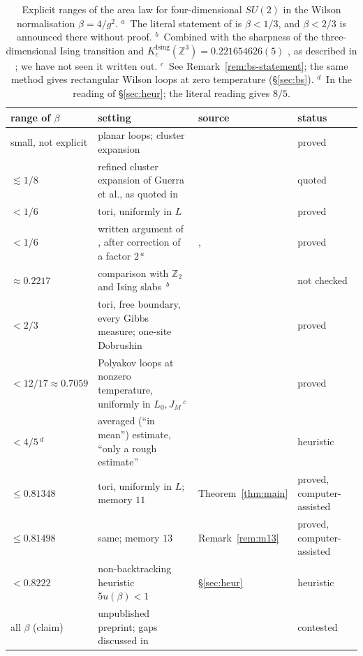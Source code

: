 \documentclass[11pt,a4paper]{article}
\theoremstyle{plain}
\theoremstyle{remark}
\numberwithin{equation}{section}
\newcommand{\Z}{\mathbb{Z}}
\begin{document}
\begin{table}[ht]
\centering\footnotesize
\begin{tabular}{@{}>{\raggedright\arraybackslash}p{}>{\raggedright\arraybackslash}p{}%
>{\raggedright\arraybackslash}p{}>{\raggedright\arraybackslash}p{}@{}}
\toprule
range of $\beta$ & setting & source & status \\
\midrule
small, not explicit & planar loops; cluster expansion & \cite[Thm.~5.1]{OS78} & proved \\
$\lesssim1/8$ & refined cluster expansion of Guerra et al., as quoted in \cite{BS83} & \cite[p.~343]{BS83} & quoted \\
$<1/6$ & tori, uniformly in $L$ & \cite[Thm.~1.6]{CNS25} & proved \\
$<1/6$ & written argument of \cite{DF80}, after correction of a factor $2$\,$^{a}$ & \cite{DF80}, \cite[\S7.2]{D7} & proved \\
$\approx0.2217$ & comparison with $\Z_2$ and Ising slabs \cite{Fro79}\,$^{b}$ & \cite[\S7.2]{D7} & not checked \\
$<2/3$ & tori, free boundary, every Gibbs measure; one-site Dobrushin & \cite[Thm.~7.1]{D7} & proved \\
$<12/17\approx0.7059$ & Polyakov loops at nonzero temperature, uniformly in $L_0,J_M$\,$^{c}$ & \cite[(II.55), p.~343; App.~B, pp.~373--377]{BS83} & proved \\
$<4/5$\,$^{d}$ & averaged (``in mean'') estimate, ``only a rough estimate'' & \cite{Fro80a,Fro80b} & heuristic \\
$\le0.81348$ & tori, uniformly in $L$; memory $11$ & Theorem~\ref{thm:main} & proved, computer-assisted \\
$\le0.81498$ & same; memory $13$ & Remark~\ref{rem:m13} & proved, computer-assisted \\
$<0.8222$ & non-backtracking heuristic $5u(\beta)<1$ & \S\ref{sec:heur} & heuristic \\
all $\beta$ (claim) & unpublished preprint; gaps discussed in \cite{IS08} & \cite{Tom07} & contested \\
\bottomrule
\end{tabular}
\caption{Explicit ranges of the area law for four-dimensional $SU(2)$ in the Wilson normalisation $\beta=4/g^2$.
$^{a}$~The literal statement of \cite{DF80} is $\beta<1/3$, and $\beta<2/3$ is announced there without proof.
$^{b}$~Combined with the sharpness of the three-dimensional Ising transition and $K_c^{\mathrm{Ising}}(\Z^3)=0.221654626(5)$
\cite{FXL18}, as described in \cite[\S7.2]{D7}; we have not seen it written out. $^{c}$~See Remark~\ref{rem:bs-statement}; the same method gives rectangular Wilson loops at zero temperature (\S\ref{sec:bs}).
$^{d}$~In the reading of \S\ref{sec:heur}; the literal reading gives $8/5$.}
\label{tab:ranges}
\end{table}
\end{document}
